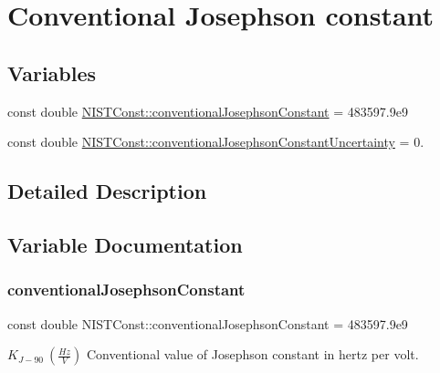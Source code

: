 \hypertarget{group___conventional_josephson_constant}{}\section{Conventional Josephson constant}
\label{group___conventional_josephson_constant}
\subsection*{Variables}
\begin{DoxyCompactItemize}
\item 
const double \hyperlink{group___conventional_josephson_constant_gaebced2333dcb300798ec2d2c128db9b9}{N\+I\+S\+T\+Const\+::conventional\+Josephson\+Constant} = 483597.\+9e9
\item 
const double \hyperlink{group___conventional_josephson_constant_ga0a76d60ad55268297c99761c7492220f}{N\+I\+S\+T\+Const\+::conventional\+Josephson\+Constant\+Uncertainty} = 0.
\end{DoxyCompactItemize}


\subsection{Detailed Description}


\subsection{Variable Documentation}
\mbox{\label{group___conventional_josephson_constant_gaebced2333dcb300798ec2d2c128db9b9}} 
\subsubsection{\texorpdfstring{conventional\+Josephson\+Constant}{conventionalJosephsonConstant}}
{\footnotesize\ttfamily const double N\+I\+S\+T\+Const\+::conventional\+Josephson\+Constant = 483597.\+9e9}

$K_{J-90} \ (\frac{Hz}{V})$ Conventional value of Josephson constant in hertz per volt. \mbox{\label{group___conventional_josephson_constant_ga0a76d60ad55268297c99761c7492220f}} 
